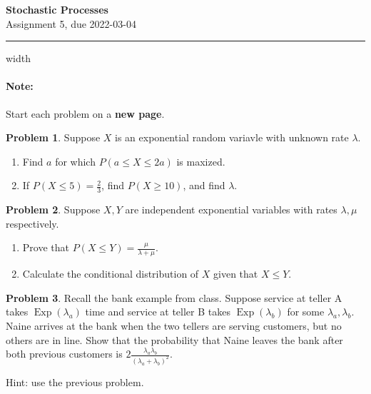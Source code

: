 \documentclass{article}
\DeclareMathOperator{\Exp}{Exp}
\theoremstyle{definition}
\newtheorem{problem}{Problem}
\begin{document}
\thispagestyle{crfooter}

\begin{center}
  {\LARGE \textbf{Stochastic Processes}} \\ \medskip
  {\Large Assignment 5, due 2022-03-04}
\end{center}

\hrule width \textwidth

\paragraph{Note:} Start each problem on a \textbf{new page}.%


\begin{problem}
  Suppose $X$ is an exponential random variavle with unknown rate $\lambda$.
  \begin{enumerate}
    \item Find $a$ for which $P(a\le X \le 2a)$ is maxized.
    \item If $P(X \le 5) = \frac23$, find $P(X\ge 10)$, and find $\lambda$.
  \end{enumerate}
\end{problem}


\begin{problem}
  Suppose $X,Y$ are independent exponential variables with rates $\lambda,\mu$ respectively.
  \begin{enumerate}
  \item Prove that $P(X\le Y) = \frac{\mu}{\lambda+\mu}$.
  \item Calculate the conditional distribution of $X$ given that $X\le Y$.
  \end{enumerate}
\end{problem}


\begin{problem}
  Recall the bank example from class.
  Suppose service at teller A takes $\Exp(\lambda_a)$ time and service at teller B takes $\Exp(\lambda_b)$ for some $\lambda_a,\lambda_b$.
  Naine arrives at the bank when the two tellers are serving customers, but no others are in line.
  Show that the probability that Naine leaves the bank after both previous customers is $2\frac{\lambda_a\lambda_b}{(\lambda_a+\lambda_b)^2}$.

  Hint: use the previous problem.
\end{problem}
\end{document}
